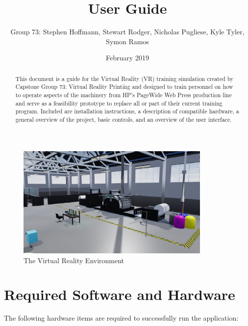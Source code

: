 \documentclass[onecolumn, draftclsnofoot,10pt, compsoc]{IEEEtran}
\title{User Guide}
\author{Group 73: Stephen Hoffmann, Stewart Rodger, Nicholas Pugliese, Kyle Tyler, Symon Ramos}
\date{February 2019}
\begin{document}
\maketitle
\begin{figure}[ht!]
    \centering
    \includegraphics[width=0.85\textwidth]{environment.png}
    \caption{The Virtual Reality Environment}
    \label{fig:printerModel}
\end{figure}

    \begin{abstract}
   This document is a guide for the Virtual Reality (VR) training simulation created by Capstone Group 73: Virtual Reality Printing and designed to train personnel on how to operate aspects of the machinery from HP's PageWide Web Press production line and serve as a feasibility prototype to replace all or part of their current training program. Included are installation instructions, a description of compatible hardware, a general overview of the project, basic controls, and an overview of the user interface. 
   
    \end{abstract}
\newpage
{}
\tableofcontents
\clearpage



\section{Required Software and Hardware}

The following hardware items are required to successfully run the application:
\end{document}
